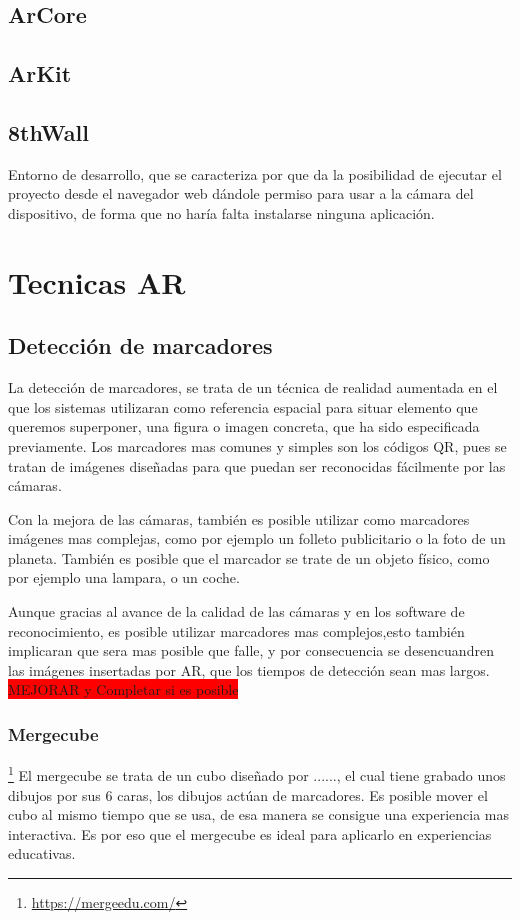 \subsection{ArCore}
\subsection{ArKit}
\subsection{8thWall}
Entorno de desarrollo, que se caracteriza por que da la posibilidad de ejecutar el proyecto desde el navegador web dándole permiso para usar a la cámara del dispositivo, de forma que no haría falta instalarse ninguna aplicación.



\section{Tecnicas AR}
	\subsection{Detección de marcadores}
	La detección de marcadores, se trata de un técnica de realidad aumentada en el que los sistemas utilizaran como referencia espacial para situar elemento que queremos superponer, una figura o imagen concreta, que ha sido especificada previamente. Los marcadores mas comunes y simples son los códigos QR, pues se tratan de imágenes diseñadas para que puedan ser reconocidas fácilmente por las cámaras.
	
	Con la mejora de las cámaras, también es posible utilizar como marcadores imágenes mas complejas, como por ejemplo un folleto publicitario o la foto de un planeta.
	También es posible que el marcador se trate de un objeto físico, como por ejemplo una lampara, o un coche.
	
	Aunque gracias al avance de la calidad de las cámaras y en los software de reconocimiento, es posible utilizar marcadores mas complejos,esto también implicaran que sera mas posible que falle, y por consecuencia se desencuandren las imágenes insertadas por AR, que los tiempos de detección sean mas largos.
	\colorbox{red}{MEJORAR y Completar si es posible}
	
	\subsubsection{Mergecube}\footnote{\url{https://mergeedu.com/}}
	El mergecube se trata de un cubo diseñado por ......, el cual tiene grabado unos dibujos por sus 6 caras, los dibujos actúan de marcadores. Es posible mover el cubo al mismo tiempo que se usa, de esa manera se consigue una experiencia mas interactiva. Es por eso que el mergecube es ideal para aplicarlo en experiencias educativas. 
